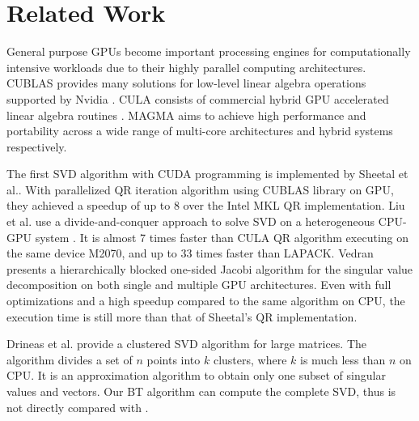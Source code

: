 \section{Related Work} \label{sec:related}
General purpose GPUs become important processing engines for computationally intensive workloads due to their highly parallel computing architectures.
CUBLAS provides many solutions for low-level linear algebra operations supported by Nvidia \cite{cublas}. 
CULA consists of commercial hybrid GPU accelerated linear algebra routines \cite{cula}.
MAGMA aims to achieve high performance and portability across a wide range of multi-core architectures and hybrid systems respectively\cite{magma}.

The first SVD algorithm with CUDA programming is implemented by Sheetal et al.\cite{09IPDPSQR}. With parallelized QR iteration algorithm using CUBLAS library on GPU, they achieved a speedup of up to 8 over the Intel MKL QR implementation.
Liu et al. use a divide-and-conquer approach to solve SVD on a heterogeneous CPU-GPU system \cite{13CFDC}.
It is almost 7 times faster than CULA QR algorithm executing on the same device M2070, and up to 33 times faster than LAPACK.
Vedran\cite{14arxivjacobi} presents a hierarchically blocked one-sided Jacobi algorithm for the singular value decomposition on both single and multiple GPU architectures. Even with full optimizations and a high speedup compared to the same algorithm on CPU, the execution time is still more than that of Sheetal's QR implementation.

Drineas et al. \cite{99clustering} provide a clustered SVD algorithm for large matrices. The algorithm divides a set of $n$ points into $k$ clusters, where $k$ is much less than $n$ on CPU.
It is an approximation algorithm to obtain only one subset of singular values
and vectors. Our BT algorithm can compute the complete SVD, thus is not
directly compared with \cite{99clustering}. 

